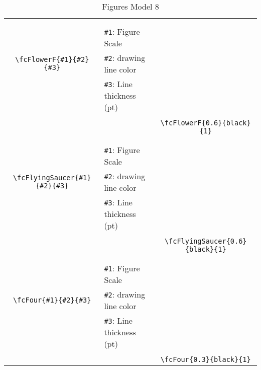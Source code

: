 \documentclass[x11names]{article}
\begin{document}
\begin{table}[H]
\begin{tabular}{|c|l|c|}
	&&\multirow{5}{*}{\fcFlowerF{0.6}{black}{1}}\\	&&\\	&\verb|#1|: Figure Scale &\\	\verb|\fcFlowerF{#1}{#2}{#3}|&	\verb|#2|: drawing line color &\\	&\verb|#3|: Line thickness (pt) &\\ &&\\&&	\verb|\fcFlowerF{0.6}{black}{1}|\\\hline 	
	&&\multirow{5}{*}{\fcFlyingSaucer{0.6}{black}{1}}\\	&&\\	&\verb|#1|: Figure Scale &\\	\verb|\fcFlyingSaucer{#1}{#2}{#3}|&	\verb|#2|: drawing line color &\\	&\verb|#3|: Line thickness (pt) &\\ &&\\&&	\verb|\fcFlyingSaucer{0.6}{black}{1}|\\\hline 	
	&&\multirow{5}{*}{\fcFour{0.3}{black}{1}}\\	&&\\	&\verb|#1|: Figure Scale &\\	\verb|\fcFour{#1}{#2}{#3}|&	\verb|#2|: drawing line color &\\	&\verb|#3|: Line thickness (pt) &\\ &&\\&&	\verb|\fcFour{0.3}{black}{1}|\\\hline 	\hline\end{tabular}\caption{Figures Model 8}\label{tab8}\end{table}
\end{document}
